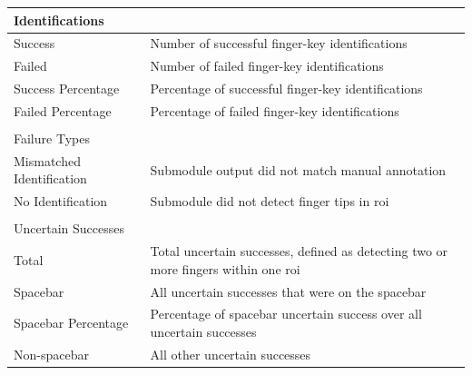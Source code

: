 \documentclass{report}
\begin{document}
\begin{table}[H]
	\centering
	\begin{tabular}{ p{} p{} }
		\hline
		Identifications                                                                                                                       \\
		\hline
		Success                                     & Number of successful finger-key identifications                                         \\
		Failed                                      & Number of failed finger-key identifications                                             \\
		Success Percentage                          & Percentage of successful finger-key identifications                                     \\
		Failed Percentage                           & Percentage of failed finger-key identifications                                         \\
		\\[0.25cm]
		\hline
		Failure Types                                                                                                                         \\
		\hline
		Mismatched Identification                   & Submodule output did not match manual annotation                                        \\
		No Identification                           & Submodule did not detect finger tips in \ac{roi}                                        \\
		\\[0.25cm]
		\hline
		Uncertain Successes                                                                                                                   \\
		\hline
		Total                                       & Total uncertain successes, defined as detecting two or more fingers within one \ac{roi} \\
		Spacebar                                    & All uncertain successes that were on the spacebar                                       \\
		Spacebar Percentage                         & Percentage of spacebar uncertain success over all uncertain successes                   \\
		Non-spacebar                                & All other uncertain successes                                                           \\

\end{tabular}
\end{table}
\end{document}
